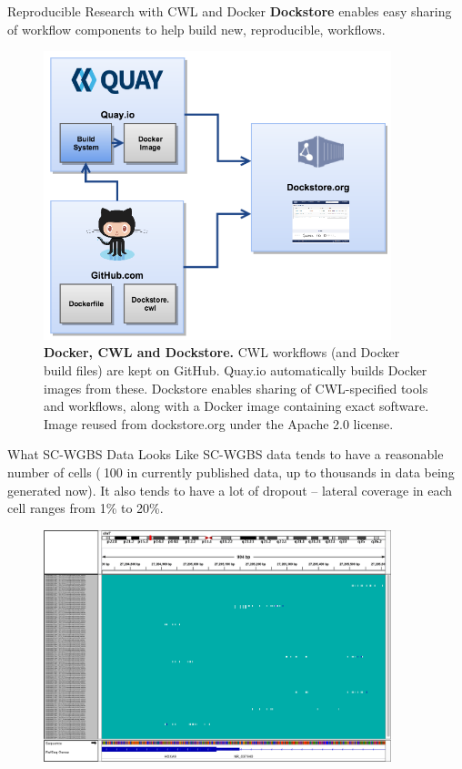 \documentclass{beamer}
\begin{document}
\begin{frame}
\begin{columns}[t]
\begin{column}{.32\textwidth}
\begin{block}{Reproducible Research with CWL and Docker}
\textbf{Dockstore} enables easy sharing of workflow components to help build new, reproducible, workflows. 
\begin{figure}
\begin{center}
\includegraphics[width=0.9\textwidth]{figures/dockstore_logos.png}
\end{center}
\caption{\textbf{Docker, CWL and Dockstore.} CWL workflows (and Docker build files) are kept on GitHub. Quay.io automatically builds Docker images from these. Dockstore enables sharing of CWL-specified tools and workflows, along with a Docker image containing exact software. Image reused from dockstore.org under the Apache 2.0 license.}
\end{figure}
\end{block}





\begin{block}{What SC-WGBS Data Looks Like}
SC-WGBS data tends to have a reasonable number of cells ($~$100 in currently published data, up to thousands in data being generated now). It also tends to have a lot of dropout -- lateral coverage in each cell ranges from 1\% to 20\%.

\begin{figure}
\begin{center}
\includegraphics[width=0.9\textwidth]{figures/hoxa9_meth.png}


\end{center}
\end{figure}
\end{block}
\end{column}
\end{columns}
\end{frame}
\end{document}
